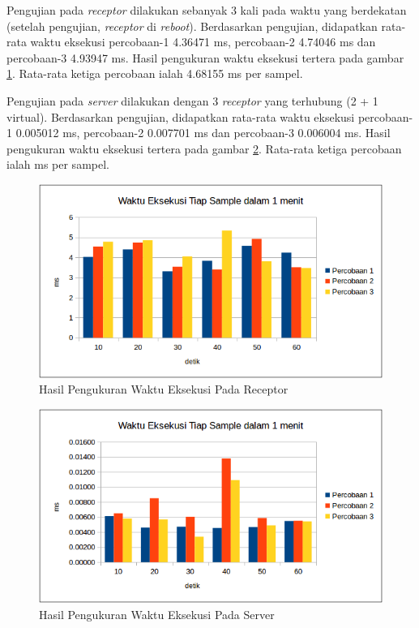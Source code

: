 Pengujian pada \textit{receptor} dilakukan sebanyak 3 kali pada waktu yang berdekatan (setelah pengujian, \textit{receptor} di \textit{reboot}). Berdasarkan pengujian, didapatkan rata-rata waktu eksekusi percobaan-1 4.36471 ms, percobaan-2 4.74046 ms dan percobaan-3 4.93947 ms. Hasil pengukuran waktu eksekusi tertera pada gambar \ref{fig:exec_time}. Rata-rata ketiga percobaan ialah 4.68155 ms per sampel.

Pengujian pada \textit{server} dilakukan dengan 3 \textit{receptor} yang terhubung (2 + 1 virtual). Berdasarkan pengujian, didapatkan rata-rata waktu eksekusi percobaan-1 0.005012 ms, percobaan-2 0.007701 ms dan percobaan-3 0.006004 ms. Hasil pengukuran waktu eksekusi tertera pada gambar \ref{fig:exec_time2}. Rata-rata ketiga percobaan ialah \execs ms per sampel.

\begin{figure}[H]
	\centering
	\includegraphics[scale=0.7]{images/exec_time1.png}
	\caption{Hasil Pengukuran Waktu Eksekusi Pada Receptor}
	\label{fig:exec_time}
\end{figure}

\begin{figure}[H]
	\centering
	\includegraphics[scale=0.7]{images/exec_time2.png}
	\caption{Hasil Pengukuran Waktu Eksekusi Pada Server}
	\label{fig:exec_time2}
\end{figure}

